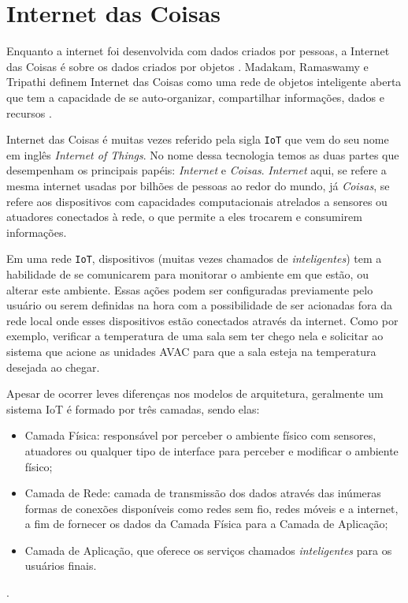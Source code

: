 \chapter{Internet das Coisas}

Enquanto a internet foi desenvolvida com dados criados por pessoas, 
a Internet das Coisas é sobre os dados criados por objetos \cite{Nord2019}. 
Madakam, Ramaswamy e Tripathi definem Internet das Coisas como uma rede de objetos inteligente 
aberta que tem a capacidade de se auto-organizar, compartilhar informações, dados e 
recursos \cite{Madakam2015}.

Internet das Coisas é muitas vezes referido pela sigla \verb'IoT' que vem do 
seu nome em inglês \textit{Internet of Things}. No nome dessa tecnologia temos as 
duas partes que desempenham os principais papéis: \emph{Internet} e \emph{Coisas}.
\emph{Internet} aqui, se refere a mesma internet usadas por bilhões de pessoas ao 
redor do mundo, já \emph{Coisas}, se refere aos dispositivos com capacidades computacionais 
atrelados a sensores ou atuadores conectados à rede, o que permite a eles trocarem e 
consumirem informações.

Em uma rede \verb'IoT', dispositivos (muitas vezes chamados de \emph{inteligentes}) tem a habilidade
de se comunicarem para monitorar o ambiente em que estão, ou alterar este ambiente. Essas ações 
podem ser configuradas previamente pelo usuário ou serem definidas na hora com a possibilidade de 
ser acionadas fora da rede local onde esses dispositivos estão conectados através da internet.
Como por exemplo, verificar a temperatura de uma sala sem ter chego nela e solicitar ao sistema que 
acione as unidades AVAC para que a sala esteja na temperatura desejada ao chegar.

Apesar de ocorrer leves diferenças nos modelos de arquitetura, 
geralmente um sistema IoT é formado por três camadas, sendo elas:

\begin{itemize}
    \item Camada Física: responsável por perceber o ambiente físico com sensores, 
    atuadores ou qualquer tipo de interface para perceber e modificar o ambiente físico;

    \item Camada de Rede: camada de transmissão dos dados através das inúmeras formas de conexões 
    disponíveis como redes sem fio, redes móveis e a internet, a fim de fornecer os dados da 
    Camada Física para a Camada de Aplicação;

    \item Camada de Aplicação, que oferece os serviços chamados \emph{inteligentes} para os usuários 
    finais.
\end{itemize}
\cite{Yan2014}.

